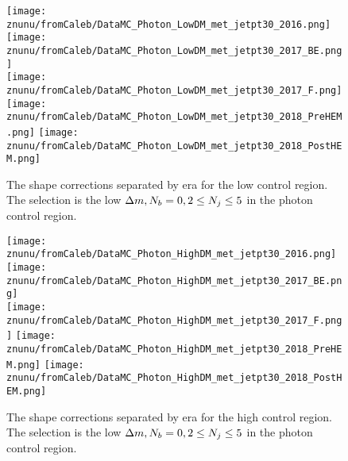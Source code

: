\begin{figure}[!h]
	\begin{center}
  \texttt{[image: znunu/fromCaleb/DataMC\_Photon\_LowDM\_met\_jetpt30\_2016.png]}
  \texttt{[image: znunu/fromCaleb/DataMC\_Photon\_LowDM\_met\_jetpt30\_2017\_BE.png]} \\
  \texttt{[image: znunu/fromCaleb/DataMC\_Photon\_LowDM\_met\_jetpt30\_2017\_F.png]}
  \texttt{[image: znunu/fromCaleb/DataMC\_Photon\_LowDM\_met\_jetpt30\_2018\_PreHEM.png]}
  \texttt{[image: znunu/fromCaleb/DataMC\_Photon\_LowDM\_met\_jetpt30\_2018\_PostHEM.png]}
	\end{center}
	\caption[\Znunu{} Shape by Era]{The \Znunu{} shape corrections separated by era for the low \dm{} control region. The selection is the low $\Delta m, N_{b}=0, 2\leq N_{j}\leq5$ in the photon control region.
	 }
	\label{fig:znunu-shape-lm-photon}
\end{figure}

\begin{figure}[!h]
	\begin{center}
  \texttt{[image: znunu/fromCaleb/DataMC\_Photon\_HighDM\_met\_jetpt30\_2016.png]}
  \texttt{[image: znunu/fromCaleb/DataMC\_Photon\_HighDM\_met\_jetpt30\_2017\_BE.png]} \\
  \texttt{[image: znunu/fromCaleb/DataMC\_Photon\_HighDM\_met\_jetpt30\_2017\_F.png]}
  \texttt{[image: znunu/fromCaleb/DataMC\_Photon\_HighDM\_met\_jetpt30\_2018\_PreHEM.png]}
  \texttt{[image: znunu/fromCaleb/DataMC\_Photon\_HighDM\_met\_jetpt30\_2018\_PostHEM.png]}
	\end{center}
	\caption[\Znunu{} Shape by Era]{The \Znunu{} shape corrections separated by era for the high \dm{} control region. The selection is the low $\Delta m, N_{b}=0, 2\leq N_{j}\leq5$ in the photon control region.
	 }
	\label{fig:znunu-shape-hm-photon}
\end{figure}